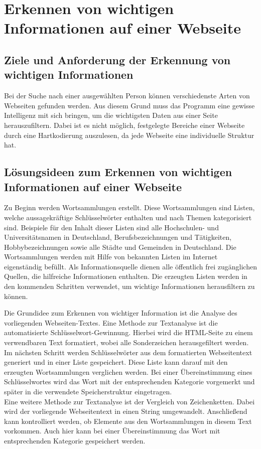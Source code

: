 \section{Erkennen von wichtigen Informationen auf einer Webseite}
	\subsection{Ziele und Anforderung der Erkennung von wichtigen Informationen}
	Bei der Suche nach einer ausgewählten Person können verschiedenste Arten von Webseiten gefunden werden. Aus diesem Grund muss das Programm eine gewisse Intelligenz mit sich bringen, um die wichtigsten Daten aus einer Seite herauszufiltern. Dabei ist es nicht möglich, festgelegte Bereiche einer Webseite durch eine Hartkodierung auszulesen, da jede Webseite eine individuelle Struktur hat.
	\subsection{Lösungsideen zum Erkennen von wichtigen Informationen auf einer Webseite}
	\label{subsec:ErkennenVonInformation}	
	Zu Beginn werden Wortsammlungen erstellt. Diese Wortsammlungen sind Listen, welche aussagekräftige Schlüsselwörter enthalten und nach Themen kategorisiert sind. Beispiele für den Inhalt dieser Listen sind alle Hochschulen- und Universitätsnamen in Deutschland, Berufsbezeichnungen und Tätigkeiten, Hobbybezeichnungen sowie alle Städte und Gemeinden in Deutschland. Die Wortsammlungen werden mit Hilfe von bekannten Listen im Internet eigenständig befüllt. Als Informationsquelle dienen alle öffentlich frei zugänglichen Quellen, die hilfreiche Informationen enthalten. Die erzeugten Listen werden in den kommenden Schritten verwendet, um wichtige Informationen herausfiltern zu können.
	
	Die Grundidee zum Erkennen von wichtiger Information ist die Analyse des vorliegenden Webseiten-Textes. Eine Methode zur Textanalyse ist die automatisierte Schlüsselwort-Gewinnung. Hierbei wird die HTML-Seite zu einem verwendbaren Text formatiert, wobei alle Sonderzeichen herausgefiltert werden. Im nächsten Schritt werden Schlüsselwörter aus dem formatierten Webseitentext generiert und in einer Liste gespeichert. Diese Liste kann darauf mit den erzeugten Wortsammlungen verglichen werden. Bei einer Übereinstimmung eines Schlüsselwortes wird das Wort mit der entsprechenden Kategorie vorgemerkt und später in die verwendete Speicherstruktur eingetragen.\\
	Eine weitere Methode zur Textanalyse ist der Vergleich von Zeichenketten. Dabei wird der vorliegende Webseitentext in einen String umgewandelt. Anschließend kann kontrolliert werden, ob Elemente aus den Wortsammlungen in diesem Text vorkommen. Auch hier kann bei einer Übereinstimmung das Wort mit entsprechenden Kategorie gespeichert werden.
	
